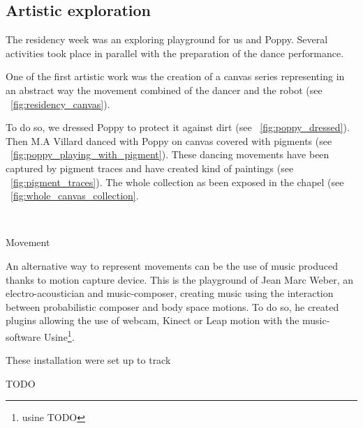 \subsection{Artistic exploration} %

The residency week was an exploring playground for us and Poppy. Several activities took place in parallel with the preparation of the dance performance.

One of the first artistic work was the creation of a canvas series representing in an abstract way the movement combined of the dancer and the robot (see \figurename~\ref{fig:residency_canvas}).

To do so, we dressed Poppy to protect it against dirt (see \figurename~\ref{fig:poppy_dressed}). Then M.A Villard danced with Poppy on canvas covered with pigments (see \figurename~\ref{fig:poppy_playing_with_pigment}). These dancing movements have been captured by pigment traces and have created kind of paintings (see \figurename~\ref{fig:pigment_traces}). The whole collection as been exposed in the chapel (see \figurename~\ref{fig:whole_canvas_collection}.

\begin{NFfigure}
\centering
    \hfil
    \\
    \hfil
    \caption{Movement }
    \label{fig:residency_canvas}
\end{NFfigure}


An alternative way to represent movements can be the use of music produced thanks to motion capture device. This is the playground of Jean Marc Weber, an electro-acoustician and music-composer, creating music using the interaction between probabilistic composer and body space motions. To do so, he created plugins allowing the use of webcam, Kinect or Leap motion with the music-software Usine\footnote{usine TODO}.

These installation were set up to track

TODO

